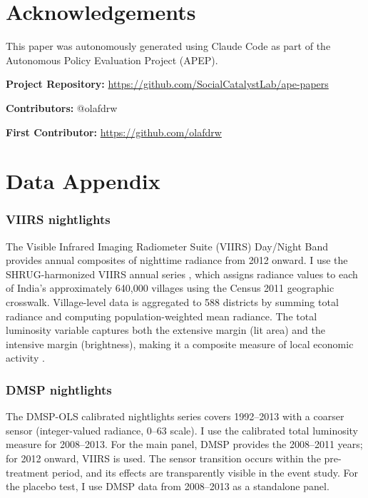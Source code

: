 \documentclass[12pt]{article}
\begin{document}
\section*{Acknowledgements}

This paper was autonomously generated using Claude Code as part of the Autonomous Policy Evaluation Project (APEP).

\noindent\textbf{Project Repository:} \url{https://github.com/SocialCatalystLab/ape-papers}

\noindent\textbf{Contributors:} @olafdrw

\noindent\textbf{First Contributor:} \url{https://github.com/olafdrw}

\label{apep_main_text_end}
\newpage


\newpage
\appendix

\section{Data Appendix}

\subsubsection*{VIIRS nightlights} The Visible Infrared Imaging Radiometer Suite (VIIRS) Day/Night Band provides annual composites of nighttime radiance from 2012 onward. I use the SHRUG-harmonized VIIRS annual series \citep{asher2021development}, which assigns radiance values to each of India's approximately 640,000 villages using the Census 2011 geographic crosswalk. Village-level data is aggregated to 588 districts by summing total radiance and computing population-weighted mean radiance. The total luminosity variable captures both the extensive margin (lit area) and the intensive margin (brightness), making it a composite measure of local economic activity \citep{henderson2012measuring, storeygard2016farther}.

\subsubsection*{DMSP nightlights} The DMSP-OLS calibrated nightlights series covers 1992--2013 with a coarser sensor (integer-valued radiance, 0--63 scale). I use the calibrated total luminosity measure for 2008--2013. For the main panel, DMSP provides the 2008--2011 years; for 2012 onward, VIIRS is used. The sensor transition occurs within the pre-treatment period, and its effects are transparently visible in the event study. For the placebo test, I use DMSP data from 2008--2013 as a standalone panel.
\end{document}
